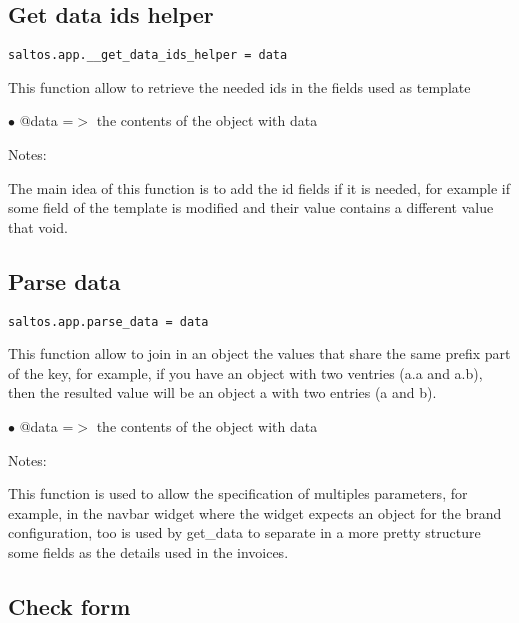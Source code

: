 \documentclass[a4paper]{book}
\begin{document}
\hypertarget{toc389}{}
\subsection{Get data ids helper}

\begin{lstlisting}
saltos.app.__get_data_ids_helper = data
\end{lstlisting}

This function allow to retrieve the needed ids in the fields used as template

\begin{compactitem}
\item[\color{myblue}$\bullet$] @data =$>$ the contents of the object with data
\end{compactitem}

Notes:

The main idea of this function is to add the id fields if it is needed, for example
if some field of the template is modified and their value contains a different value
that void.

\hypertarget{toc390}{}
\subsection{Parse data}

\begin{lstlisting}
saltos.app.parse_data = data
\end{lstlisting}

This function allow to join in an object the values that share the same prefix part of
the key, for example, if you have an object with two ventries (a.a and a.b), then the
resulted value will be an object a with two entries (a and b).

\begin{compactitem}
\item[\color{myblue}$\bullet$] @data =$>$ the contents of the object with data
\end{compactitem}

Notes:

This function is used to allow the specification of multiples parameters, for example,
in the navbar widget where the widget expects an object for the brand configuration, too
is used by get\_data to separate in a more pretty structure some fields as the details used
in the invoices.

\hypertarget{toc391}{}
\subsection{Check form}
\end{document}
